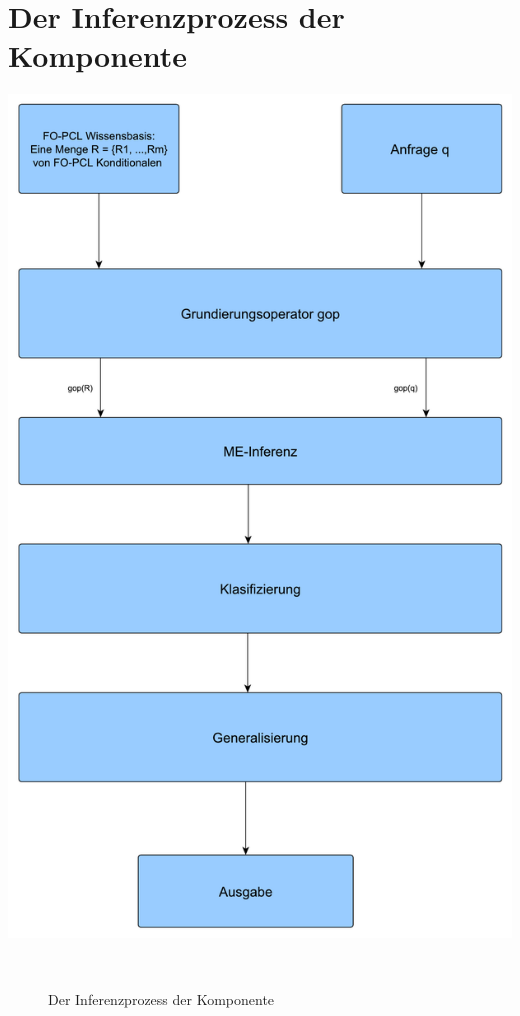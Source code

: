 \documentclass[a4paper, 11pt]{book}
\begin{document}
\section{Der Inferenzprozess der Komponente}
\includegraphics[scale = 0.4]{Graphics/Inferenzprozess_Komponente}
\begin{figure}[h]
	\caption{Der Inferenzprozess der Komponente }\
\end{figure}
\\
	
\end{document}
